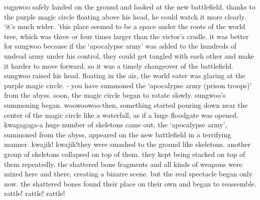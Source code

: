 sugnwoo safely landed on the ground and looked at the new battlefield.
 thanks to the purple magic circle floating above his head, he could watch it more clearly.
‘it’s much wider.
’this place seemed to be a space under the roots of the world tree, which was three or four times larger than the victor’s cradle.
it was better for sungwoo because if the ‘apocalypse army’ was added to the hundreds of undead army under his control, they could get tangled with each other and make it harder to move forward.
 so it was a timely changeover of the battlefield.
sungwoo raised his head.
 floating in the air, the world eater was glaring at the purple magic circle.
- you have summoned the ‘apocalypse army (prison troops)’ from the abyss.
soon, the magic circle began to rotate slowly.
 sungwoo’s summoning began.
woowoowoo-then, something started pouring down near the center of the magic circle like a waterfall, as if a huge floodgate was opened.
kwagagaga-a huge number of skeletons came out.
 the ‘apocalypse army’, summoned from the abyss, appeared on the new battlefield in a terrifying manner.
kwajik! kwajik!they were smashed to the ground like skeletons.
 another group of skeletons collapsed on top of them.
 they kept being stacked on top of them repeatedly.
the shattered bone fragments and all kinds of weapons were mixed here and there, creating a bizarre scene.
but the real spectacle began only now.
 the shattered bones found their place on their own and began to reassemble.
rattle! rattle! rattle!

 